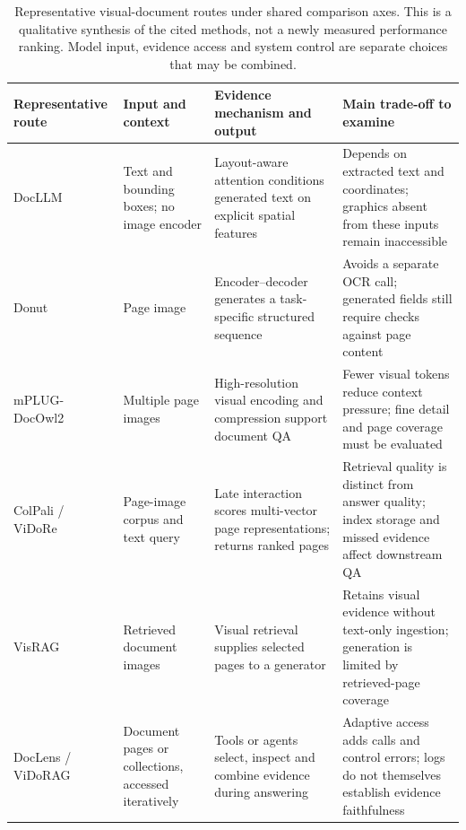 \begin{table}[t]
\centering
\small
\renewcommand{\arraystretch}{1.16}
\begin{tabularx}{\textwidth}{@{}p{}p{}XX@{}}
\toprule
Representative route & Input and context & Evidence mechanism and output & Main trade-off to examine \\
\midrule
DocLLM~\cite{wang2024docllm} & Text and bounding boxes; no image encoder & Layout-aware attention conditions generated text on explicit spatial features & Depends on extracted text and coordinates; graphics absent from these inputs remain inaccessible \\
Donut~\cite{kim2022donut} & Page image & Encoder--decoder generates a task-specific structured sequence & Avoids a separate OCR call; generated fields still require checks against page content \\
mPLUG-DocOwl2~\cite{ye2024docowl2} & Multiple page images & High-resolution visual encoding and compression support document QA & Fewer visual tokens reduce context pressure; fine detail and page coverage must be evaluated \\
ColPali / ViDoRe~\cite{faysse2024colpali} & Page-image corpus and text query & Late interaction scores multi-vector page representations; returns ranked pages & Retrieval quality is distinct from answer quality; index storage and missed evidence affect downstream QA \\
VisRAG~\cite{yu2024visrag} & Retrieved document images & Visual retrieval supplies selected pages to a generator & Retains visual evidence without text-only ingestion; generation is limited by retrieved-page coverage \\
DocLens / ViDoRAG~\cite{zhu2025doclens,wang2025vidorag} & Document pages or collections, accessed iteratively & Tools or agents select, inspect and combine evidence during answering & Adaptive access adds calls and control errors; logs do not themselves establish evidence faithfulness \\
\bottomrule
\end{tabularx}
\caption{Representative visual-document routes under shared comparison axes. This is a qualitative synthesis of the cited methods, not a newly measured performance ranking. Model input, evidence access and system control are separate choices that may be combined.}
\label{tab:visual_document_routes}
\end{table}

